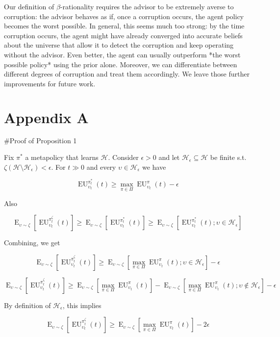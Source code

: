 \documentclass[a4paper]{article}
\DeclareMathOperator{\E}{E}
\newcommand{\Hy}{\mathcal{H}}
\newcommand{\EU}{\operatorname{EU}}
\begin{document}
Our definition of $\beta$-rationality requires the advisor to be extremely averse to corruption: the advisor behaves as if, once a corruption occurs, the agent policy becomes the worst possible. In general, this seems much too strong: by the time corruption occurs, the agent might have already converged into accurate beliefs about the universe that allow it to detect the corruption and keep operating without the advisor. Even better, the agent can usually outperform *the worst possible policy* using the prior alone. Moreover, we can differentiate between different degrees of corruption and treat them accordingly. We leave those further improvements for future work.


\section{Appendix A}

\#Proof of Proposition 1

Fix $\pi^*$ a metapolicy that learns $\Hy$. Consider $\epsilon > 0$ and let $\Hy_\epsilon \subseteq \Hy$ be finite s.t. $\zeta(\Hy \setminus \Hy_\epsilon) < \epsilon$. For $t \gg 0$ and every $\upsilon \in \Hy_\epsilon$ we have

$$\EU_{\upsilon_t}^{\pi^*_t}(t) \geq \max_{\pi \in \Pi} \EU_{\upsilon_t}^{\pi}(t) - \epsilon$$

Also

$$\E_{\upsilon \sim \zeta}[\EU_{\upsilon_t}^{\pi^\zeta_t}(t)] \geq \E_{\upsilon \sim \zeta}[\EU_{\upsilon_t}^{\pi^*_t}(t)] \geq \E_{\upsilon \sim \zeta}[\EU_{\upsilon_t}^{\pi^*_t}(t); \upsilon \in \Hy_\epsilon]$$

Combining, we get

$$\E_{\upsilon \sim \zeta}[\EU_{\upsilon_t}^{\pi^\zeta_t}(t)] \geq \E_{\upsilon \sim \zeta}[\max_{\pi \in \Pi} \EU_{\upsilon_t}^{\pi}(t); \upsilon \in \Hy_\epsilon] - \epsilon$$

$$\E_{\upsilon \sim \zeta}[\EU_{\upsilon_t}^{\pi^\zeta_t}(t)] \geq \E_{\upsilon \sim \zeta}[\max_{\pi \in \Pi} \EU_{\upsilon_t}^{\pi}(t)] -  \E_{\upsilon \sim \zeta}[\max_{\pi \in \Pi} \EU_{\upsilon_t}^{\pi}(t); \upsilon \not\in \Hy_\epsilon] - \epsilon$$

By definition of $\Hy_\epsilon$, this implies

$$\E_{\upsilon \sim \zeta}[\EU_{\upsilon_t}^{\pi^\zeta_t}(t)] \geq \E_{\upsilon \sim \zeta}[\max_{\pi \in \Pi} \EU_{\upsilon_t}^{\pi}(t)] -  2\epsilon$$
\end{document}
